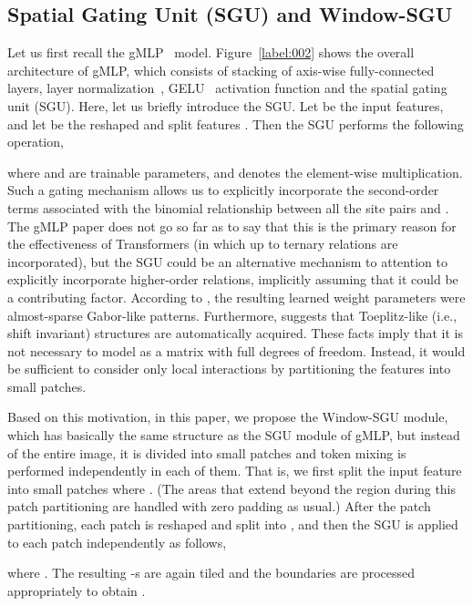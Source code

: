\documentclass{article}
\begin{document}
\subsection{Spatial Gating Unit (SGU) and Window-SGU}\label{label:010}

Let us first recall the gMLP~\citep{liu2021pay} model. Figure~\ref{label:002} shows the overall architecture of gMLP,
which consists of stacking of axis-wise fully-connected layers, layer normalization~\citep{ba2016layer}, GELU~\citep{hendrycks2016gaussian} activation function and the spatial gating unit (SGU).
Here, let us briefly introduce the SGU. Let  be the input features,
and let  be the reshaped and split features .
Then the SGU performs the following operation,

where  and   are trainable parameters, and  denotes the element-wise multiplication.
Such a gating mechanism allows us to explicitly incorporate the second-order terms  associated with the binomial relationship between all the site pairs  and .
The gMLP paper does not go so far as to say that this is the primary reason for the effectiveness of Transformers (in which up to ternary relations are incorporated), but the SGU could be an alternative mechanism to attention to explicitly incorporate higher-order relations, implicitly assuming that it could be a contributing factor. According to \citep[Figures 3]{liu2021pay}, the resulting learned weight parameters  were almost-sparse Gabor-like patterns. Furthermore, \citep[Figure 9]{liu2021pay} suggests that Toeplitz-like (i.e., shift invariant) structures are automatically acquired. These facts imply that it is not necessary to model  as a matrix with full degrees of freedom. Instead, it would be sufficient to consider only local interactions by partitioning the features into small patches.

Based on this motivation,
in this paper, we propose the Window-SGU module, which has basically the same structure as the SGU module of gMLP, but instead of the entire image, it is divided into small patches and token mixing is performed independently in each of them.
That is, we first split the input feature 
into small patches  where .
(The areas that extend beyond the  region during this patch partitioning are handled with zero padding as usual.)
After the patch partitioning, each patch  is reshaped and split into
, and then the SGU is applied to each patch independently as follows,

where 
.
The resulting -s are again tiled and the boundaries are processed appropriately to obtain .
\end{document}
